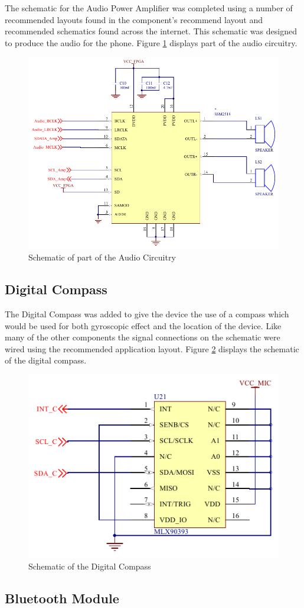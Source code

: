 	The schematic for the Audio Power Amplifier was completed using a number of recommended layouts found in the component's recommend layout and recommended schematics found across the internet. This schematic was designed to produce the audio for the phone. 
Figure \ref{fig:audio} displays part of the audio circuitry. 

\begin{figure}
	\includegraphics[width=0.5\linewidth]{Figures/audio_circuitry.pdf}\centering
	\caption{Schematic of part of the Audio Circuitry}
	\label{fig:audio}
\end{figure}

\subsection{Digital Compass}

	The Digital Compass was added to give the device the use of a compass which would be used for both gyroscopic effect and the location of the device.
Like many of the other components the signal connections on the schematic were wired using the recommended application layout. 
Figure \ref{fig:compass} displays the schematic of the digital compass. 

\begin{figure}
	\includegraphics[width=0.5\linewidth]{Figures/compass.pdf}\centering
	\caption{Schematic of the Digital Compass}
	\label{fig:compass}
\end{figure}

\subsection{Bluetooth Module}

